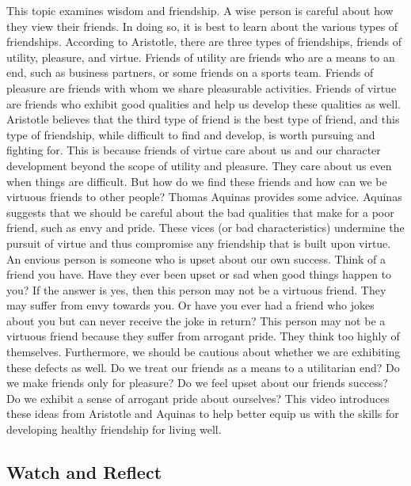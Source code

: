 \documentclass[
]{book}
\begin{document}
This topic examines wisdom and friendship. A wise person is careful about how they view their friends. In doing so, it is best to learn about the various types of friendships. According to Aristotle, there are three types of friendships, friends of utility, pleasure, and virtue. Friends of utility are friends who are a means to an end, such as business partners, or some friends on a sports team. Friends of pleasure are friends with whom we share pleasurable activities. Friends of virtue are friends who exhibit good qualities and help us develop these qualities as well. Aristotle believes that the third type of friend is the best type of friend, and this type of friendship, while difficult to find and develop, is worth pursuing and fighting for. This is because friends of virtue care about us and our character development beyond the scope of utility and pleasure. They care about us even when things are difficult. But how do we find these friends and how can we be virtuous friends to other people? Thomas Aquinas provides some advice. Aquinas suggests that we should be careful about the bad qualities that make for a poor friend, such as envy and pride. These vices (or bad characteristics) undermine the pursuit of virtue and thus compromise any friendship that is built upon virtue. An envious person is someone who is upset about our own success. Think of a friend you have. Have they ever been upset or sad when good things happen to you? If the answer is yes, then this person may not be a virtuous friend. They may suffer from envy towards you. Or have you ever had a friend who jokes about you but can never receive the joke in return? This person may not be a virtuous friend because they suffer from arrogant pride. They think too highly of themselves. Furthermore, we should be cautious about whether we are exhibiting these defects as well. Do we treat our friends as a means to a utilitarian end? Do we make friends only for pleasure? Do we feel upset about our friends success? Do we exhibit a sense of arrogant pride about ourselves? This video introduces these ideas from Aristotle and Aquinas to help better equip us with the skills for developing healthy friendship for living well.

\hypertarget{watch-and-reflect-4}{%
\subsection*{Watch and Reflect}\label{watch-and-reflect-4}}
\end{document}
